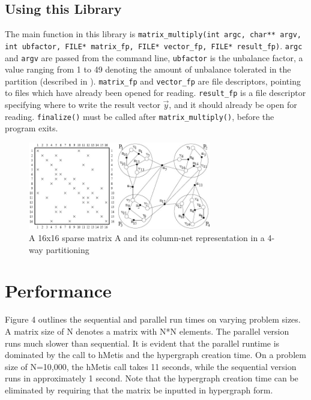 \documentclass{article}
\begin{document}
\subsection{Using this Library}

The main function in this library is \texttt{matrix\_multiply(int argc, char** argv, int ubfactor, FILE* matrix\_fp, FILE* vector\_fp, FILE* result\_fp)}. \texttt{argc} and \texttt{argv} are passed from the command line, \texttt{ubfactor} is the unbalance factor, a value ranging from 1 to 49 denoting the amount of unbalance tolerated in the partition (described in \cite{hmetis}). \texttt{matrix\_fp} and \texttt{vector\_fp} are file descriptors, pointing to files which have already been opened for reading. \texttt{result\_fp} is a file descriptor specifying where to write the result vector \(\vec{y}\), and it should already be open for reading. \texttt{finalize()} must be called after \texttt{matrix\_multiply()}, before the program exits.

\begin{figure}[htb]
\begin{center}
\mbox{\includegraphics[width=80mm]{decomp.JPG}}
\end{center}
\caption{A 16x16 sparse matrix A and its column-net representation in a 4-way partitioning}
\label{fig2}
\end{figure}

\section{Performance}

Figure 4 outlines the sequential and parallel run times on varying problem sizes. A matrix size of N denotes a matrix with N*N elements. The parallel version runs much slower than sequential. It is evident that the parallel runtime is dominated by the call to hMetis and the hypergraph creation time. On a problem size of N=10,000, the hMetis call takes 11 seconds, while the sequential version runs in approximately 1 second. Note that the hypergraph creation time can be eliminated by requiring that the matrix be inputted in hypergraph form. 
\end{document}
